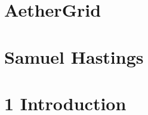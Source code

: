 \documentclass{article}
\begin{document}
\section*{\huge{AetherGrid}}
\normalsize{} 


\section*{\huge{Samuel Hastings}}
\normalsize{} 


\section*{\huge{1 Introduction}}
\normalsize{} 


\noindent \vspace{5mm} %
\end{document}
